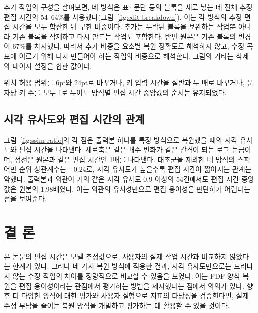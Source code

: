 \documentclass{kcc}
\begin{document}


추가 작업의 구성을 살펴보면, 네 방식은 표·문단 등의 블록을 새로 넣는 데 전체 추정 편집 시간의 54--64\%를 사용했다(그림~\ref{fig:edit-breakdown}).
이는 각 방식의 추정 편집 시간을 모두 합산한 뒤 구한 비중이다.
추가는 누락된 블록을 보완하는 작업뿐 아니라 기존 블록을 삭제하고 다시 만드는 작업도 포함한다.
반면 원본은 기존 블록의 변경이 67\%를 차지했다.
따라서 추가 비중을 요소별 복원 정확도로 해석하지 않고, 수정 목표에 이르기 위해 다시 만들어야 하는 작업의 비중으로 해석한다.
그림의 기타는 삭제와 페이지 설정을 합한 값이다.



위치 허용 범위를 6pt와 24pt로 바꾸거나, 키 입력 시간을 절반과 두 배로 바꾸거나, 문자당 키 수를 모두 1로 두어도 방식별 편집 시간 중앙값의 순서는 유지되었다.

\balance
\subsection{시각 유사도와 편집 시간의 관계}

그림~\ref{fig:ssim-ratio}의 각 점은 출력본 하나를 특정 방식으로 복원했을 때의 시각 유사도와 편집 시간을 나타낸다.
세로축은 같은 배수 변화가 같은 간격이 되는 로그 눈금이며, 점선은 원본과 같은 편집 시간인 1배를 나타낸다.
대조군을 제외한 네 방식의 스피어만 순위 상관계수는 $-0.24$로, 시각 유사도가 높을수록 편집 시간이 짧아지는 관계는 약했다.
출력본과 외관이 거의 같은 시각 유사도 0.9 이상의 54건에서도 편집 시간 중앙값은 원본의 1.98배였다.
이는 외관의 유사성만으로 편집 용이성을 판단하기 어렵다는 점을 보여준다.



\section{결 론}

본 논문의 편집 시간은 모델 추정값으로, 사용자의 실제 작업 시간과 비교하지 않았다는 한계가 있다.
그러나 네 가지 복원 방식에 적용한 결과, 시각 유사도만으로는 드러나지 않는 수정 작업의 차이를 정량적으로 비교할 수 있음을 보였다.
이는 PDF 양식 복원을 편집 용이성이라는 관점에서 평가하는 방법을 제시했다는 점에서 의의가 있다.
향후 더 다양한 양식에 대한 평가와 사용자 실험으로 지표의 타당성을 검증한다면, 실제 수정 부담을 줄이는 복원 방식을 개발하고 평가하는 데 활용할 수 있을 것이다.

{\small


}
\end{document}

